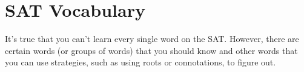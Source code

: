 \section{SAT Vocabulary}
It's true that you can't learn every single word on the SAT. However, there are certain words (or groups of words) that you should know and other words that you can use strategies, such as using roots or connotations, to figure out.

